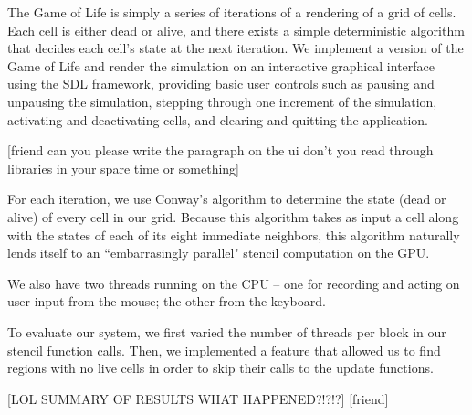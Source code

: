 \documentclass[12pt]{article}
\begin{document}
	The Game of Life is simply a series of iterations of a rendering of a grid of cells. Each cell is either dead or alive, and there exists a simple deterministic algorithm that decides each cell's state at the next iteration. We implement a version of the Game of Life and render the simulation on
        an interactive graphical interface using the SDL framework, providing
        basic user controls such as pausing and unpausing the simulation,
        stepping through one increment of the simulation, activating and
        deactivating cells, and clearing and quitting the application.

	[friend can you please write the paragraph on the ui don't you read through libraries in your spare time or something]
	
	For each iteration, we use Conway's algorithm to determine the state (dead or alive) of every cell in our grid. Because this algorithm takes as input a cell along with the states of each of its eight immediate neighbors, this algorithm naturally lends itself to an ``embarrasingly parallel" stencil computation on the GPU.
	
	We also have two threads running on the CPU -- one for recording and acting on user input from the mouse; the other from the keyboard. 
	
	To evaluate our system, we first varied the number of threads per block in our stencil function calls. Then, we implemented a feature that allowed us to find regions with no live cells in order to skip their calls to the update functions. 
	
	[LOL SUMMARY OF RESULTS WHAT HAPPENED?!?!?] [friend]
\end{document}
